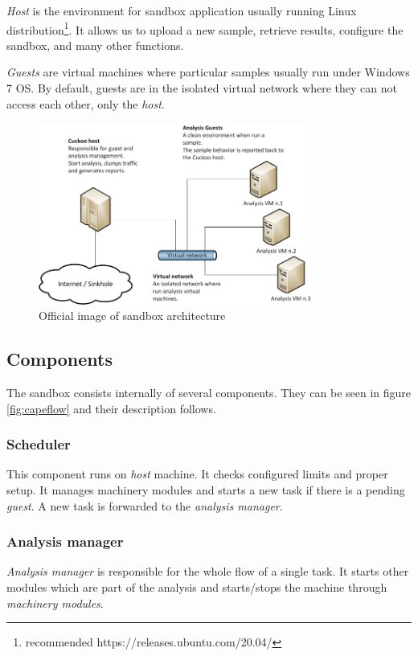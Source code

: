 \emph{Host} is the environment for sandbox application usually running Linux distribution\footnote{recommended https://releases.ubuntu.com/20.04/}. It allows us to upload a new sample, retrieve results, configure the sandbox, and many other functions.

\emph{Guests} are virtual machines where particular samples usually run under Windows 7 OS. By default, guests are in the isolated virtual network where they can not access each other, only the \emph{host}.

\begin{figure}[h]
  \centering
  \includegraphics[width=0.8\textwidth]{figures/architecture.png}
  \caption{Official image of sandbox architecture \cite{CAPESand75:online}}
  \label{fig:capearchitecture}
\end{figure}

\subsection{Components}
The sandbox consists internally of several components. They can be seen in figure \ref{fig:capeflow} and their description follows.

\subsubsection*{Scheduler}
This component runs on \emph{host} machine. It checks configured limits and proper setup. It manages machinery modules and starts a new task if there is a pending \emph{guest}. A new task is forwarded to the \emph{analysis manager}.

\subsubsection*{Analysis manager}
\emph{Analysis manager} is responsible for the whole flow of a single task. It starts other modules which are part of the analysis and starts/stops the machine through \emph{machinery modules}.

